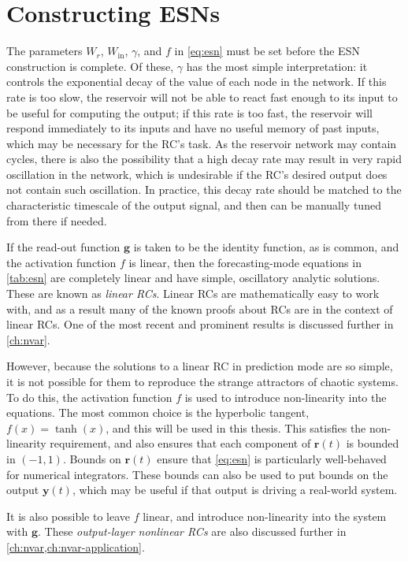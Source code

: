\section{Constructing ESNs}\label{sec:esn-construction}

The parameters $W_r$, $W_\text{in}$, $\gamma$, and $f$ in
\cref{eq:esn} must be set before the ESN construction is complete. Of
these, $\gamma$ has the most simple interpretation: it controls the
exponential decay of the value of each node in the network. If this
rate is too slow, the reservoir will not be able to react fast enough
to its input to be useful for computing the output; if this rate is
too fast, the reservoir will respond immediately to its inputs and
have no useful memory of past inputs, which may be necessary for the
RC's task. As the reservoir network may contain cycles, there is also
the possibility that a high decay rate may result in very rapid
oscillation in the network, which is undesirable if the RC's desired
output does not contain such oscillation. In practice, this decay rate
should be matched to the characteristic timescale of the output
signal, and then can be manually tuned from there if needed.

If the read-out function $\bm{g}$ is taken to be the identity
function, as is common, and the activation function $f$ is linear,
then the forecasting-mode equations in \cref{tab:esn} are completely
linear and have simple, oscillatory analytic solutions. These are
known as \emph{linear RCs}. Linear RCs are mathematically easy to work
with, and as a result many of the known proofs about RCs are in the
context of linear RCs. One of the most recent and prominent results is
discussed further in \cref{ch:nvar}.

However, because the solutions to a linear RC in prediction mode are
so simple, it is not possible for them to reproduce the strange
attractors of chaotic systems. To do this, the activation function $f$
is used to introduce non-linearity into the equations. The most common
choice is the hyperbolic tangent, $f(x) = \tanh(x)$, and this will be
used in this thesis. This satisfies the non-linearity requirement, and
also ensures that each component of $\bm{r}(t)$ is bounded in $(-1,
1)$. Bounds on $\bm{r}(t)$ ensure that \cref{eq:esn} is particularly
well-behaved for numerical integrators. These bounds can also be used
to put bounds on the output $\bm{y}(t)$, which may be useful if that
output is driving a real-world system.

It is also possible to leave $f$ linear, and introduce non-linearity
into the system with $\bm{g}$. These \emph{output-layer nonlinear RCs} are
also discussed further in \cref{ch:nvar,ch:nvar-application}.

